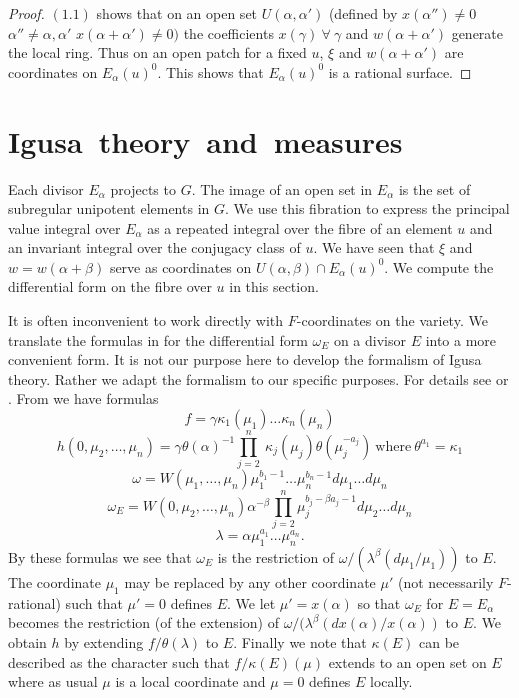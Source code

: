\documentclass{memo-l}
\theoremstyle{definition}
\theoremstyle{remark}
\numberwithin{section}{chapter}
\numberwithin{equation}{chapter}
\begin{document}
\begin{proof}
   $(1.1)$ shows that on an open set $U({\alpha},{\alpha}')$ (defined by
$x({\alpha''}) \ne 0$ ${\alpha''} \ne {\alpha},{\alpha}'$  $x({\alpha}+{\alpha}') \ne
0)$ the coefficients $x({\gamma}) {\ \forall\ } {\gamma}$ and
$w({\alpha}+{\alpha}')$ generate the local ring.  Thus on an open patch for
a fixed $u$, ${\xi}$ and $w({\alpha}+{\alpha}')$ are coordinates on
$E_{{\alpha}}(u)^{0}$.  This shows that $E_{{\alpha}}(u)^{0}$ is a rational
surface.
\end{proof}


\section{Igusa\ theory\ and\ measures}

   Each divisor $E_{{\alpha}}$ projects to $G$.  The image of an open set
in $E_{{\alpha}}$ is the set of subregular unipotent elements in $G$.  We
use this fibration to express the principal value integral over
$E_{{\alpha}}$ as a repeated integral over the fibre of an element $u$ and
an invariant integral over the conjugacy class of $u$.  We have seen that
${\xi}$ and $w  =  w({\alpha}+{\beta})$ serve as coordinates on
$U({\alpha},{\beta}) \cap E_{{\alpha}}(u)^{0}$.  We compute the
differential form on the fibre over $u$ in this section.

   It is often inconvenient to work directly with $F$-coordinates on the
variety.  We translate the formulas in \cite{MR701566} for the differential form
${\omega}_{E}$ on a divisor $E$ into a more convenient form.  It is not our
purpose here to develop the formalism of Igusa theory.  Rather we adapt the
formalism to our specific purposes.  For details see \cite{MR546292} or \cite{MR701566}.  From
\cite{MR701566} we have formulas
$$
f  =  {\gamma}{\kappa}_{1}({\mu}_{1})\ldots {\kappa}_{n}({\mu}_{n})
$$
$$
h(0,{\mu}_{2},\ldots ,{\mu}_{n})  =  {\gamma}{\theta}({\alpha})^{-1}
\prod^n_{j = 2}\
{\kappa}_{j}({\mu}_{j}){\theta}({\mu}_{j}^{-a_{j}})\ {\text{where}}\
{\theta}^{a_1}  =  {\kappa}_{1}
$$
$$
{\omega}  =  W({\mu}_{1},\ldots ,{\mu}_{n}){\mu}_{1}^{b_{1}-1} \ldots
{\mu}_{n}^{b_{n}-1} d{\mu}_{1}\ldots d{\mu}_{n}
$$
$$
{\omega}_{E}  =  W(0,{\mu}_{2},\ldots ,{\mu}_{n}){\alpha}^{-{\beta}}
\prod^n_{j = 2} {\mu}_{j}^{b_{j}-{\beta}a_{j}-1} d{\mu}_{2}\ldots d{\mu}_{n}
$$
$$
{\lambda}  =  {\alpha}{\mu}_{1}^{a_{1}} \ldots {\mu}_{n}^{a_{n}} .
$$
By these formulas we see that ${\omega}_{E}$ is the restriction of
${\omega}/({\lambda}^{{\beta}}(d{\mu}_{1}/{\mu}_{1}))$ to $E$.  The
coordinate ${\mu}_{1}$ may be replaced by any other coordinate ${\mu}'$
(not necessarily $F$-rational) such that ${\mu}'  =  0$ defines $E$.  We let
${\mu}'  =  x({\alpha})$ so that ${\omega}_{E}$ for $E  =  E_{{\alpha}}$ becomes
the restriction (of the extension) of
${\omega}/({\lambda}^{{\beta}}(dx({\alpha})/x({\alpha}))$ to $E$.  We
obtain $h$ by extending $f/{\theta}({\lambda})$ to $E$.  Finally we note
that ${\kappa}(E)$ can be described as the character such that
$f/{\kappa}(E)({\mu})$ extends to an open set on $E$ where as usual ${\mu}$
is a local coordinate and ${\mu}  =  0$ defines $E$ locally.
\end{document}
